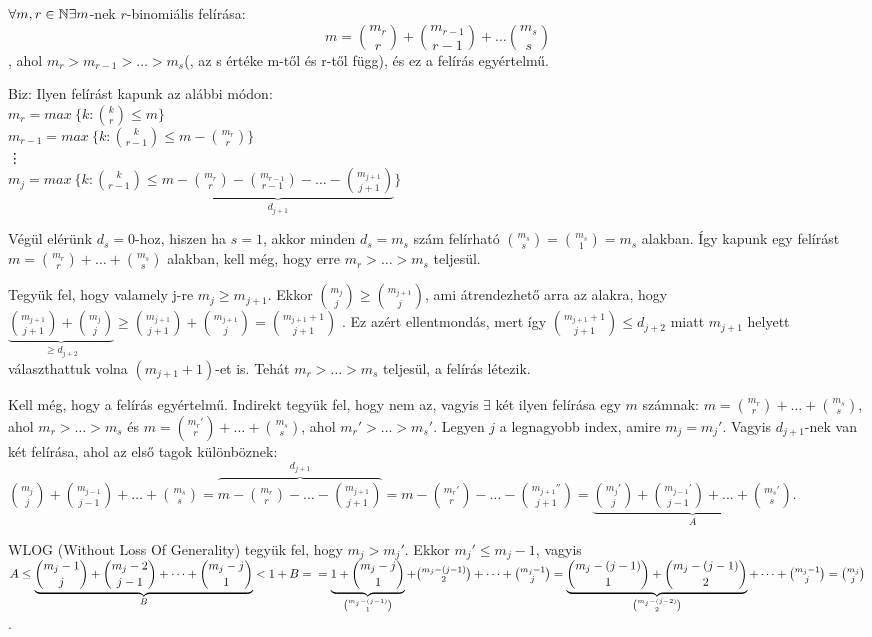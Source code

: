 \begin{thm}
  $\forall m, r \in \mathbb{N} \exists m$-nek $r$-binomiális felírása:
  \[m = \binom{m_r}{r} + \binom{m_{r-1}}{r-1} + \dots \binom{m_s}{s}\], ahol $m_r > m_{r-1} > \dots > m_s$(, az s értéke m-től és r-től függ), és ez a felírás egyértelmű.
\end{thm}

\begin{samepage} %
  Biz: Ilyen felírást kapunk az alábbi módon: \\
  $m_r = max~\{k: \binom{k}{r} \leq m\}$ \\
  $m_{r-1} = max~\{k: \binom{k}{r-1} \leq m - \binom{m_r}{r}\}$ \\
  \vdots \\
  $m_j = max~\{k: \binom{k}{r-1} \leq \underbrace{m - \binom{m_r}{r} - \binom{m_{r-1}}{r-1} - \dots - \binom{m_{j+1}}{j+1}}_{d_{j+1}}\}$
\end{samepage}

Végül elérünk $d_s = 0$-hoz, hiszen ha $s=1$, akkor minden $d_s = m_s$ szám felírható $\binom{m_s}{s} = \binom{m_s}{1} = m_s$ alakban. Így kapunk egy felírást $m = \binom{m_r}{r} + \dots + \binom{m_s}{s}$ alakban, kell még, hogy erre $m_r > \dots > m_s$ teljesül.

Tegyük fel, hogy valamely j-re $m_j \geq m_{j+1}$. Ekkor $\binom{m_j}{j} \geq \binom{m_{j+1}}{j}$, ami átrendezhető arra az alakra, hogy $\underbrace{\binom{m_{j+1}}{j+1} + \binom{m_j}{j}}_{\geq d_{j+2}} \geq \binom{m_{j+1}}{j+1} + \binom{m_{j+1}}{j} = \binom{m_{j+1} + 1}{j+1}$ \Lightning. Ez azért ellentmondás, mert így $\binom{m_{j+1}+1}{j+1} \leq d_{j+2}$ miatt $m_{j+1}$ helyett választhattuk volna $(m_{j+1} + 1)$-et is. Tehát $m_r > \dots > m_s$ teljesül, a felírás létezik.

Kell még, hogy a felírás egyértelmű. Indirekt tegyük fel, hogy nem az, vagyis $\exists$ két ilyen felírása egy $m$ számnak: $m = \binom{m_r}{r} + \dots + \binom{m_s}{s}$, ahol $m_r > \dots > m_s$ és $m = \binom{m_r'}{r} + \dots + \binom{m_s}{s}$, ahol $m_r' > \dots > m_s'$. Legyen $j$ a legnagyobb index, amire $m_j = m_j'$. Vagyis $d_{j+1}$-nek van két felírása, ahol az első tagok különböznek: $\binom{m_j}{j} + \binom{m_{j-1}}{j-1} + \dots + \binom{m_s}{s} = \overbrace{m - \binom{m_r}{r} - \dots - \binom{m_{j+1}}{j+1}}^{d_{j+1}} = m - \binom{m_r'}{r} - \dots - \binom{m_{j+1}''}{j+1} = \underbrace{\binom{m_j'}{j} + \binom{m_{j-1}'}{j-1} + \dots + \binom{m_s'}{s}}_{A}$.

WLOG (Without Loss Of Generality) tegyük fel, hogy $m_j > m_j'$. Ekkor $m_j' \leq m_j-1$, vagyis $A \leq \underbrace{\binom{m_j-1}{j} + \binom{m_j-2}{j-1} + \dots + \binom{m_j-j}{1}}_{B} < 1+B = \\ = \underbrace{1 + \binom{m_j-j}{1}}_{\binom{m_j-(j-1)}{1}} + \binom{m_j-(j-1)}{2} + \dots + \binom{m_j-1}{j} = \underbrace{\binom{m_j-(j-1)}{1} + \binom{m_j-(j-1)}{2}}_{\binom{m_j-(j-2)}{2}} + \dots + \binom{m_j-1}{j} = \binom{m_j}{j}$.

